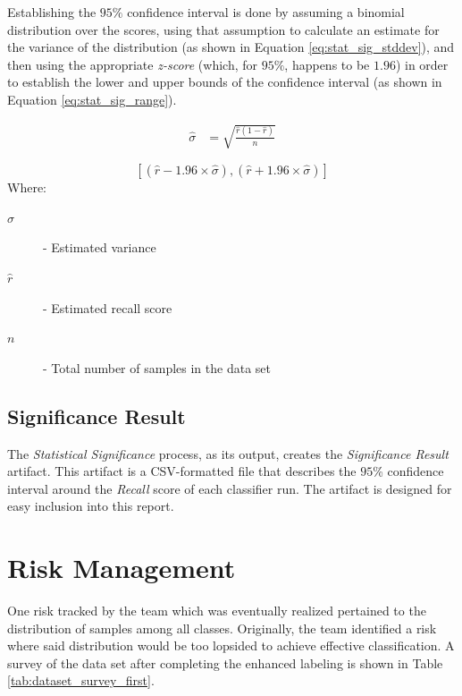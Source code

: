 \documentclass[conference]{sig-alternate-05-2015}
\begin{document}
Establishing the $95\%$ confidence interval is done by
assuming a binomial distribution over the scores, using that assumption to
calculate an estimate for the variance of the distribution (as shown
in Equation \ref{eq:stat_sig_stddev}), and then using the appropriate
\textit{z-score} (which, for $95\%$, happens to be $1.96$) in order to establish
the lower and upper bounds of the confidence interval (as shown in Equation
\ref{eq:stat_sig_range}).\par

\noindent\hrulefill
\begin{equation}
  \label{eq:stat_sig_stddev}
  \begin{aligned}
    \hat{\sigma} &= \sqrt{\frac{\hat{r}(1-\hat{r})}{n}}
  \end{aligned}
\end{equation}

\begin{equation}
  \label{eq:stat_sig_range}
  [(\hat{r} - 1.96 \times \hat{\sigma}), (\hat{r} + 1.96 \times \hat{\sigma})]
\end{equation}
\noindent Where:
\begin{description}
  \item[$\hat{\sigma}$] - Estimated variance
  \item[$\hat{r}$] - Estimated recall score
  \item[$n$] - Total number of samples in the data set  
\end{description}
\noindent\hrulefill

\subsection{Significance Result}\label{subsec:stat_sig_result}
The \textit{Statistical Significance} process, as its output, creates the
\textit{Significance Result} artifact. This artifact is a CSV-formatted file
that describes the $95$\% confidence interval around the \textit{Recall} score
of each classifier run. The artifact is designed for easy inclusion into this
report.

\section{Risk Management}\label{sec:expectations}

One risk tracked by the team which was eventually realized pertained to the
distribution of samples among all classes. Originally, the team identified a
risk where said distribution would be too lopsided to achieve effective
classification. A survey of the data set after completing the enhanced labeling
is shown in Table \ref{tab:dataset_survey_first}.
\end{document}
